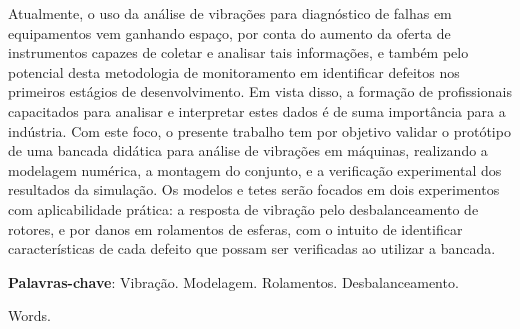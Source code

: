 \imprimircapa
\imprimirfolhaderosto
\clearpage


%	

\begin{resumo}
	\SingleSpacing
	Atualmente, o uso da análise de vibrações para diagnóstico de falhas em equipamentos vem ganhando espaço, por conta do aumento da oferta de instrumentos capazes de coletar e analisar tais informações, e também pelo potencial desta metodologia de monitoramento em identificar defeitos nos primeiros estágios de desenvolvimento.
	Em vista disso, a formação de profissionais capacitados para analisar e interpretar estes dados é de suma importância para a indústria.
	Com este foco, o presente trabalho tem por objetivo validar o protótipo de uma bancada didática para análise de vibrações em máquinas, realizando a modelagem numérica, a montagem do conjunto, e a verificação experimental dos resultados da simulação.
	Os modelos e tetes serão focados em dois experimentos com aplicabilidade prática: a resposta de vibração pelo desbalanceamento de rotores, e por danos em rolamentos de esferas, com o intuito de identificar características de cada defeito que possam ser verificadas ao utilizar a bancada.
	\vspace{\onelineskip}
	
	\noindent
	\textbf{Palavras-chave}: Vibração. Modelagem. Rolamentos. Desbalanceamento.
\end{resumo}

%		
	Words.

